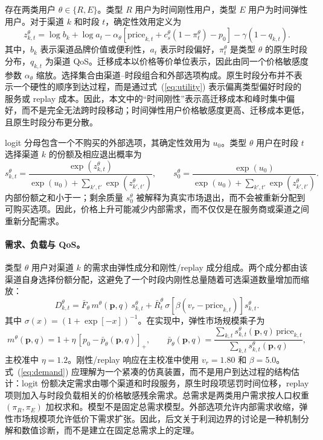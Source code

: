 \documentclass[UTF8,11pt,a4paper]{ctexart}
\newcommand{\D}{D}
\newcommand{\p}{\boldsymbol{p}}
\begin{document}
存在两类用户 $\theta\in\{R,E\}$。类型 $R$ 用户为时间刚性用户，类型 $E$ 用户为时间弹性用户。对于渠道 $k$ 和时段 $t$，确定性效用定义为
\begin{equation}
  z^\theta_{k,t}=\log b_k+\log a_t
  -\alpha_\theta\!\left[\text{price}_{k,t}+c_s^\theta(1-\pi^\theta_t)-p_0\right]
  -\gamma(1-q_{k,t}).
  \label{eq:utility}
\end{equation}
其中，$b_k$ 表示渠道品牌价值或便利性，$a_t$ 表示时段偏好，$\pi^\theta_t$ 是类型 $\theta$ 的原生时段分布，$q_{k,t}$ 为渠道 QoS。迁移成本以价格等价单位表示，因此由同一个价格敏感度参数 $\alpha_\theta$ 缩放。选择集合由渠道--时段组合和外部选项构成。原生时段分布并不表示一个硬性的顺序到达过程，而是通过式~(\ref{eq:utility}) 表示偏离类型偏好时段的服务或 replay 成本。因此，本文中的“时间刚性”表示高迁移成本和峰时集中偏好，而不是完全无法跨时段移动；时间弹性用户价格敏感度更高、迁移成本更低，且原生时段分布更分散。

logit 分母包含一个不购买的外部选项，其确定性效用为 $u_0$。类型 $\theta$ 用户在时段 $t$ 选择渠道 $k$ 的份额及相应退出概率为
\begin{equation}
  s^\theta_{k,t}=\frac{\exp(z^\theta_{k,t})}{\exp(u_0)+\sum_{k',t'}\exp(z^\theta_{k',t'})},
  \qquad
  s^\theta_0=\frac{\exp(u_0)}{\exp(u_0)+\sum_{k',t'}\exp(z^\theta_{k',t'})}.
  \label{eq:share}
\end{equation}
内部份额之和小于一；剩余质量 $s^\theta_0$ 被解释为真实市场退出，而不会被重新分配到可购买选项。因此，价格上升可能减少内部需求，而不仅仅是在服务商或渠道之间重新分配需求。

\paragraph{需求、负载与 QoS。}

类型 $\theta$ 用户对渠道 $k$ 的需求由弹性成分和刚性/replay 成分组成。两个成分都由该渠道自身选择份额分配，这避免了一个时段内刚性总量随着可选渠道数量增加而缩放：
\begin{equation}
  \D^\theta_{k,t}=\bar F_\theta\,m^\theta(\p,q)\,s^\theta_{k,t}
  +\bar R^\theta_t\,\sigma[\beta(v_r-\text{price}_{k,t})]s^\theta_{k,t}.
  \label{eq:demand}
\end{equation}
其中 $\sigma(x)=(1+\exp[-x])^{-1}$。在实现中，弹性市场规模乘子为
\begin{equation}
  m^\theta(\p,q)
  =
  1+\eta\,[p_0-\bar p_\theta(\p,q)]_+,
  \qquad
  \bar p_\theta(\p,q)
  =
  \frac{\sum_{k,t}s^\theta_{k,t}(\p,q)\,\text{price}_{k,t}}
       {\sum_{k,t}s^\theta_{k,t}(\p,q)} ,
  \label{eq:market_size}
\end{equation}
主校准中 $\eta=1.2$。刚性/replay 响应在主校准中使用 $v_r=1.80$ 和 $\beta=5.0$。式~(\ref{eq:demand}) 应理解为一个紧凑的仿真装置，而不是用户到达过程的结构估计：logit 份额决定需求由哪个渠道和时段服务，原生时段项惩罚时间位移，replay 项则加入与时段负载相关的价格敏感残余需求。总需求是两类用户需求按人口权重 $(\pi_R,\pi_E)$ 加权求和。模型不是固定总需求模型。外部选项允许内部需求收缩，弹性市场规模项允许低价下需求扩张。因此，后文关于利润边界的讨论是一种机制分解和数值诊断，而不是建立在固定总需求上的定理。
\end{document}
